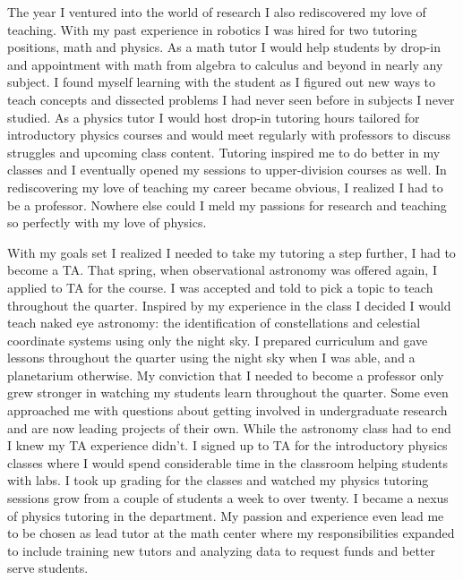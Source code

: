 \documentclass[a4paper, 12pt]{article}
\begin{document}
The year I ventured into the world of research I also rediscovered my love of teaching. With my past experience in robotics I was hired for two tutoring positions, math and physics. As a math tutor I would help students by drop-in and appointment with math from algebra to calculus and beyond in nearly any subject. I found myself learning with the student as I figured out new ways to teach concepts and dissected problems I had never seen before in subjects I never studied. As a physics tutor I would host drop-in tutoring hours tailored for introductory physics courses and would meet regularly with professors to discuss struggles and upcoming class content. Tutoring inspired me to do better in my classes and I eventually opened my sessions to upper-division courses as well. In rediscovering my love of teaching my career became obvious, I realized I had to be a professor. Nowhere else could I meld my passions for research and teaching so perfectly with my love of physics.

With my goals set I realized I needed to take my tutoring a step further, I had to become a TA. That spring, when observational astronomy was offered again, I applied to TA for the course. I was accepted and told to pick a topic to teach throughout the quarter. Inspired by my experience in the class I decided I would teach naked eye astronomy: the identification of constellations and celestial coordinate systems using only the night sky. I prepared curriculum and gave lessons throughout the quarter using the night sky when I was able, and a planetarium otherwise. My conviction that I needed to become a professor only grew stronger in watching my students learn throughout the quarter. Some even approached me with questions about getting involved in undergraduate research and are now leading projects of their own. While the astronomy class had to end I knew my TA experience didn't. I signed up to TA for the introductory physics classes where I would spend considerable time in the classroom helping students with labs. I took up grading for the classes and watched my physics tutoring sessions grow from a couple of students a week to over twenty. I became a nexus of physics tutoring in the department. My passion and experience even lead me to be chosen as lead tutor at the math center where my responsibilities expanded to include training new tutors and analyzing data to request funds and better serve students.
\end{document}

